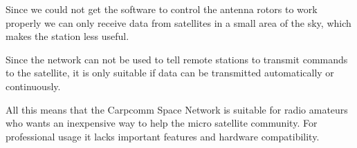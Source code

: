 Since we could not get the software to control the antenna rotors to work properly we can only receive data from satellites in a small area of the sky, which makes the station less useful.

Since the network can not be used to tell remote stations to transmit commands to the satellite, it is only suitable if data can be transmitted automatically or continuously.

All this means that the Carpcomm Space Network is suitable for radio amateurs who wants an inexpensive way to help the micro satellite community. For professional usage it lacks important features and hardware compatibility.





